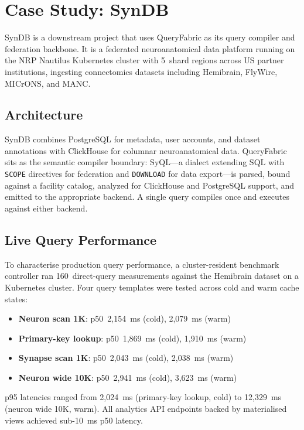\documentclass[11pt,a4paper]{article}
\begin{document}
\section{Case Study: SynDB}
\label{sec:syndb}

SynDB is a downstream project that uses QueryFabric as its query compiler
and federation backbone.
It is a federated neuroanatomical data platform running on the NRP Nautilus
Kubernetes cluster with 5~shard regions across US partner institutions,
ingesting connectomics datasets including Hemibrain, FlyWire, MICrONS,
and MANC.

\subsection{Architecture}

SynDB combines PostgreSQL for metadata, user accounts, and dataset
annotations with ClickHouse for columnar neuroanatomical data.
QueryFabric sits as the semantic compiler boundary: SyQL---a dialect
extending SQL with \texttt{SCOPE} directives for federation and
\texttt{DOWNLOAD} for data export---is parsed, bound against a facility
catalog, analyzed for ClickHouse and PostgreSQL support, and emitted
to the appropriate backend.
A single query compiles once and executes against either backend.

\subsection{Live Query Performance}

To characterise production query performance, a cluster-resident benchmark
controller ran 160~direct-query measurements against the Hemibrain dataset
on a Kubernetes cluster.
Four query templates were tested across cold and warm cache states:
\begin{itemize}
  \item \textbf{Neuron scan 1K}: p50~2,154~ms (cold), 2,079~ms (warm)
  \item \textbf{Primary-key lookup}: p50~1,869~ms (cold), 1,910~ms (warm)
  \item \textbf{Synapse scan 1K}: p50~2,043~ms (cold), 2,038~ms (warm)
  \item \textbf{Neuron wide 10K}: p50~2,941~ms (cold), 3,623~ms (warm)
\end{itemize}
p95 latencies ranged from 2,024~ms (primary-key lookup, cold) to
12,329~ms (neuron wide 10K, warm).
All analytics API endpoints backed by materialised views achieved sub-10~ms
p50 latency.
\end{document}
